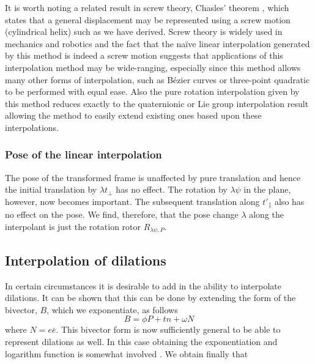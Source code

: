 
It is worth noting a related result in screw theory, Chasles' theorem \cite{SCREW:Ball}, which
states that a general displacement may be represented using a screw motion
(cylindrical helix) such as we have derived. Screw theory is widely used in
mechanics and robotics and the fact that the na\"ive linear interpolation
generated by this method is indeed a screw motion suggests that
applications of this interpolation method may be wide-ranging, especially since
this method allows many other forms of interpolation, such as B\'ezier curves
or three-point quadratic to be performed with equal ease. Also the pure
rotation interpolation given by this method reduces exactly to the quaternionic
or Lie group interpolation result allowing the method to easily extend
existing ones based upon these interpolations.

\subsubsection{Pose of the linear interpolation}

The pose of the transformed frame is unaffected by pure translation and hence the initial
translation by $\lambda t_\perp$ has no effect. The rotation by $\lambda \psi$ in the plane,
however, now becomes important. The subsequent translation along $t'_\parallel$ also has
no effect on the pose. We find, therefore, that the pose change $\lambda$ along the 
interpolant is just the rotation rotor $R_{\lambda \psi, P}$.

\subsection{Interpolation of dilations}

In certain circumstances it is desirable to add in the ability to interpolate
dilations. It can be shown \cite{jic23fyr} that this can be done by extending
the form of the bivector, $B$, which we exponentiate, as follows
\[
B = \phi P + tn + \omega N
\]
where $N = e\bar{e}$. This bivector form is now sufficiently general
\cite{jic23fyr} to be able to represent dilations as well. In this case obtaining the
exponentiation
and logarithm function is somewhat involved \cite{jic23fyr}. We obtain
finally that

